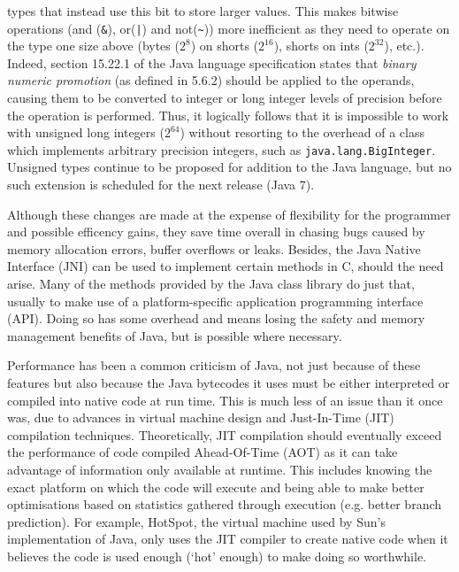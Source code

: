 \begin{itemize}
  types that instead use this bit to store larger values.  This makes
  bitwise operations (and (\texttt{\&}), or(\texttt{|}) and
  not(\texttt{\~})) more inefficient as they need to operate on the
  type one size above (bytes ($2^8$) on shorts ($2^{16}$), shorts on
  ints ($2^{32}$), etc.).  Indeed, section 15.22.1 of the Java
  language specification\cite{javaspec} states that \emph{binary
    numeric promotion} (as defined in 5.6.2) should be applied to the
  operands, causing them to be converted to integer or long integer
  levels of precision before the operation is performed.  Thus, it
  logically follows that it is impossible to work with unsigned long
  integers ($2^64$) without resorting to the overhead of a class which
  implements arbitrary precision integers, such as
  \texttt{java.lang.BigInteger}.  Unsigned types continue to be
  proposed for addition to the Java language, but no such extension is
  scheduled for the next release (Java 7).
\end{itemize}

Although these changes are made at the expense of flexibility for the
programmer and possible efficency gains, they save time overall in
chasing bugs caused by memory allocation errors, buffer overflows or
leaks.  Besides, the Java Native Interface (JNI) can be used to
implement certain methods in C, should the need arise.  Many of the
methods provided by the Java class library do just that, usually to
make use of a platform-specific application programming interface
(API).  Doing so has some overhead and means losing the safety and
memory management benefits of Java, but is possible where necessary.

Performance has been a common criticism of Java, not just because of
these features but also because the Java bytecodes it uses must be
either interpreted or compiled into native code at run time.  This is
much less of an issue than it once was, due to advances in virtual
machine design and Just-In-Time (JIT) compilation techniques.
Theoretically, JIT compilation should eventually exceed the
performance of code compiled Ahead-Of-Time (AOT) as it can take
advantage of information only available at runtime.  This includes
knowing the exact platform on which the code will execute and being
able to make better optimisations based on statistics gathered through
execution (e.g. better branch prediction).  For example, HotSpot, the
virtual machine used by Sun's implementation of Java, only uses the
JIT compiler to create native code when it believes the code is used
enough (`hot' enough) to make doing so worthwhile.

